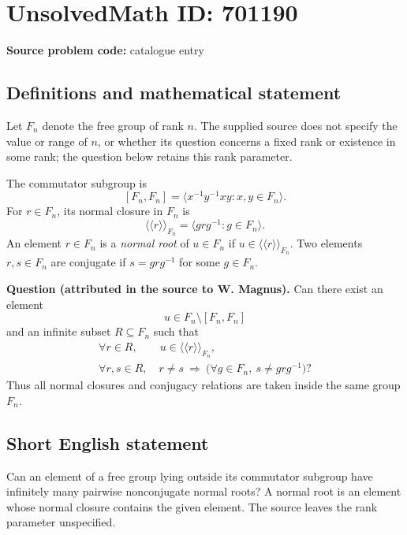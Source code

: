 \documentclass[11pt]{article}
\begin{document}
\section*{UnsolvedMath ID: 701190}
\textbf{Source problem code:} catalogue entry
\subsection{Definitions and mathematical statement}
Let \(F_n\) denote the free group of rank \(n\). The supplied source does not specify the value or range of \(n\), or whether its question concerns a fixed rank or existence in some rank; the question below retains this rank parameter.

The commutator subgroup is
\[
[F_n,F_n]=\langle x^{-1}y^{-1}xy : x,y\in F_n\rangle.
\]
For \(r\in F_n\), its normal closure in \(F_n\) is
\[
\langle\!\langle r\rangle\!\rangle_{F_n}
=\langle grg^{-1}:g\in F_n\rangle.
\]
An element \(r\in F_n\) is a \emph{normal root} of \(u\in F_n\) if \(u\in\langle\!\langle r\rangle\!\rangle_{F_n}\). Two elements \(r,s\in F_n\) are conjugate if \(s=grg^{-1}\) for some \(g\in F_n\).

\textbf{Question (attributed in the source to W. Magnus).} Can there exist an element
\[
u\in F_n\setminus[F_n,F_n]
\]
and an infinite subset \(R\subseteq F_n\) such that
\[
\begin{gathered}
\forall r\in R,\qquad u\in\langle\!\langle r\rangle\!\rangle_{F_n},\\
\forall r,s\in R,\quad r\ne s\ \Longrightarrow\
\bigl(\forall g\in F_n,\ s\ne grg^{-1}\bigr)?
\end{gathered}
\]
Thus all normal closures and conjugacy relations are taken inside the same group \(F_n\).
\subsection{Short English statement}
Can an element of a free group lying outside its commutator subgroup have infinitely many pairwise nonconjugate normal roots? A normal root is an element whose normal closure contains the given element. The source leaves the rank parameter unspecified.
\end{document}
